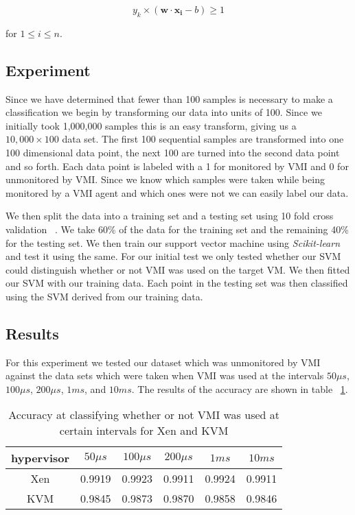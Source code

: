 \begin{equation}\label{SVMFinal}
	y_k \times (\bm{w}\cdot \bm{x_i} - b) \ge 1 
\end{equation}

for $1 \le i \le n$. 


\subsection{Experiment}

Since we have determined that fewer than 100 samples is necessary to make a classification we begin by transforming our data into units of 100. Since we initially took 1,000,000 samples this is an easy transform, giving us a $10,000 \times 100$ data set. The first 100 sequential samples are transformed into one 100 dimensional data point, the next 100 are turned into the second data point and so forth. Each data point is labeled with a 1 for monitored by VMI and 0 for unmonitored by VMI. Since we know which samples were taken while being monitored by a VMI agent and which ones were not we can easily label our data. 

We then split the data into a training set and a testing set using 10 fold cross validation ~\cite{bishop_pattern_2006}. We take 60\% of the data for the training set and the remaining 40\% for the testing set. We then train our support vector machine using \textit{Scikit-learn} and test it using the same. For our initial test we only tested whether our SVM could distinguish whether or not VMI was used on the target VM.  We then fitted our SVM with our training data. Each point in the testing set was then classified using the SVM derived from our training data. 

\subsection{Results}
For this experiment we tested our dataset which was unmonitored by VMI against the data sets which were taken when VMI was used at the intervals $50\mu s$, $100\mu s$, $200\mu s$, $1ms$, and $10ms$. The results of the accuracy are shown in table ~\ref{SVMResults}. 
\begin{table}\label{SVMResults}
    \centering
      \begin{tabular}{| c | c | c | c | c | c |}
        \hline
        hypervisor & $50\mu s$ & $100\mu s$ & $200 \mu s$ & $1ms$ & $10ms$ \\ \hline
        Xen & 0.9919 & 0.9923 & 0.9911 & 0.9924 & 0.9911 \\ \hline 
        KVM & 0.9845 & 0.9873 & 0.9870 & 0.9858 & 0.9846 \\ \hline   
    \end{tabular}
    \caption{Accuracy at classifying whether or not VMI was used at certain intervals for Xen and KVM}
  \end{table}


